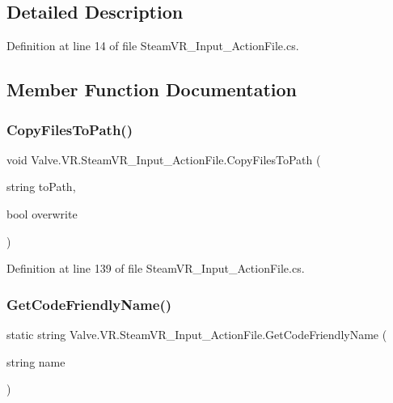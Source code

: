 \subsection{Detailed Description}


Definition at line 14 of file Steam\+V\+R\+\_\+\+Input\+\_\+\+Action\+File.\+cs.



\subsection{Member Function Documentation}
\mbox{\label{class_valve_1_1_v_r_1_1_steam_v_r___input___action_file_a9ec2e625d10d93d546c5730d9b11f571}} 
\subsubsection{\texorpdfstring{CopyFilesToPath()}{CopyFilesToPath()}}
{\footnotesize\ttfamily void Valve.\+V\+R.\+Steam\+V\+R\+\_\+\+Input\+\_\+\+Action\+File.\+Copy\+Files\+To\+Path (\begin{DoxyParamCaption}\item[{string}]{to\+Path,  }\item[{bool}]{overwrite }\end{DoxyParamCaption})}



Definition at line 139 of file Steam\+V\+R\+\_\+\+Input\+\_\+\+Action\+File.\+cs.

\mbox{\label{class_valve_1_1_v_r_1_1_steam_v_r___input___action_file_a09049d3050af7c3cfe7d611fca459bc1}} 
\subsubsection{\texorpdfstring{GetCodeFriendlyName()}{GetCodeFriendlyName()}}
{\footnotesize\ttfamily static string Valve.\+V\+R.\+Steam\+V\+R\+\_\+\+Input\+\_\+\+Action\+File.\+Get\+Code\+Friendly\+Name (\begin{DoxyParamCaption}\item[{string}]{name }\end{DoxyParamCaption})\hspace{0.3cm}{\ttfamily [static]}}



